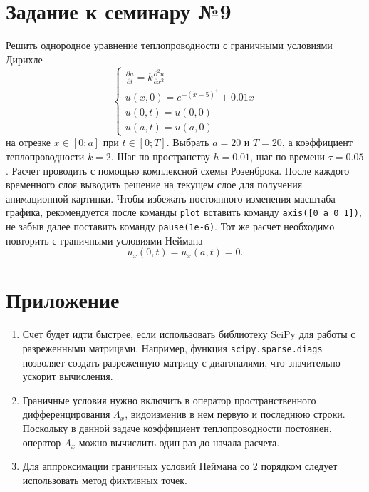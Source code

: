 \documentclass{report}
\begin{document}
\section*{Задание к семинару №9}
Решить однородное уравнение теплопроводности с граничными условиями Дирихле 
\begin{equation} \label{c9eq1}
	\begin{cases}
		\displaystyle \frac{\partial u}{\partial t} = k \frac{\partial^2 u}{\partial x^2} \\
		\displaystyle u(x,0) = e^{-(x-5)^4} + 0.01x \\
		u(0,t) = u(0,0) \\  
		u(a,t) = u(a,0)
	\end{cases}
\end{equation}
на отрезке $x \in [0; a]$ при $t \in [0; T]$. Выбрать $a = 20$ и $T = 20$, а коэффициент теплопроводности $k = 2$. Шаг по пространству $h = 0.01$, шаг по времени $\tau = 0.05$. Расчет проводить с помощью комплексной схемы Розенброка. После каждого временного слоя выводить решение на текущем слое для получения анимационной картинки. Чтобы избежать постоянного изменения масштаба графика, рекомендуется после команды \texttt{\lstinline|plot|} вставить команду \texttt{\lstinline|axis([0 a 0 1])|}, не забыв далее поставить команду \texttt{\lstinline|pause(1e-6)|}.
Тот же расчет необходимо повторить с граничными условиями Неймана
\begin{equation} \label{c9eq2}
	u_x(0,t) = u_x(a,t) = 0.
\end{equation}

\section*{Приложение}
\begin{enumerate}
\item Счет будет идти быстрее, если использовать библиотеку SciPy для работы с разреженными матрицами. Например, функция \texttt{\lstinline|scipy.sparse.diags|} позволяет создать разреженную матрицу с диагоналями, что значительно ускорит вычисления.
\item Граничные условия нужно включить в оператор пространственного дифференцирования $\Lambda_x$, видоизменив в нем первую и последнюю строки. Поскольку в данной задаче коэффициент теплопроводности постоянен, оператор $\Lambda_x$ можно вычислить один раз до начала расчета.
\item Для аппроксимации граничных условий Неймана со 2 порядком следует использовать метод фиктивных точек.
\end{enumerate}
\end{document}
